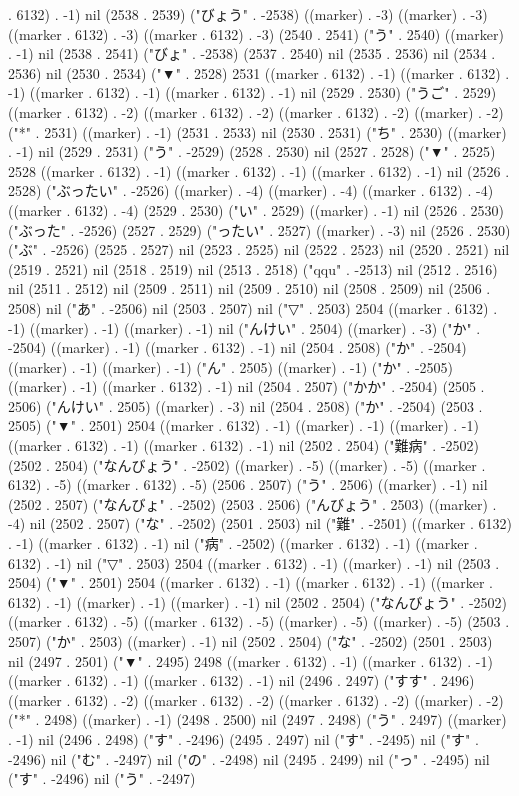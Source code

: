 . 6132) . -1) nil (2538 . 2539) ("びょう" . -2538) ((marker) . -3) ((marker) . -3) ((marker . 6132) . -3) ((marker . 6132) . -3) (2540 . 2541) ("う" . 2540) ((marker) . -1) nil (2538 . 2541) ("びょ" . -2538) (2537 . 2540) nil (2535 . 2536) nil (2534 . 2536) nil (2530 . 2534) ("▼" . 2528) 2531 ((marker . 6132) . -1) ((marker . 6132) . -1) ((marker . 6132) . -1) ((marker . 6132) . -1) nil (2529 . 2530) ("うご" . 2529) ((marker . 6132) . -2) ((marker . 6132) . -2) ((marker . 6132) . -2) ((marker) . -2) ("*" . 2531) ((marker) . -1) (2531 . 2533) nil (2530 . 2531) ("ち" . 2530) ((marker) . -1) nil (2529 . 2531) ("う" . -2529) (2528 . 2530) nil (2527 . 2528) ("▼" . 2525) 2528 ((marker . 6132) . -1) ((marker . 6132) . -1) ((marker . 6132) . -1) nil (2526 . 2528) ("ぶったい" . -2526) ((marker) . -4) ((marker) . -4) ((marker . 6132) . -4) ((marker . 6132) . -4) (2529 . 2530) ("い" . 2529) ((marker) . -1) nil (2526 . 2530) ("ぶった" . -2526) (2527 . 2529) ("ったい" . 2527) ((marker) . -3) nil (2526 . 2530) ("ぶ" . -2526) (2525 . 2527) nil (2523 . 2525) nil (2522 . 2523) nil (2520 . 2521) nil (2519 . 2521) nil (2518 . 2519) nil (2513 . 2518) ("qqu" . -2513) nil (2512 . 2516) nil (2511 . 2512) nil (2509 . 2511) nil (2509 . 2510) nil (2508 . 2509) nil (2506 . 2508) nil ("あ" . -2506) nil (2503 . 2507) nil ("▽" . 2503) 2504 ((marker . 6132) . -1) ((marker) . -1) ((marker) . -1) nil ("んけい" . 2504) ((marker) . -3) ("か" . -2504) ((marker) . -1) ((marker . 6132) . -1) nil (2504 . 2508) ("か" . -2504) ((marker) . -1) ((marker) . -1) ("ん" . 2505) ((marker) . -1) ("か" . -2505) ((marker) . -1) ((marker . 6132) . -1) nil (2504 . 2507) ("かか" . -2504) (2505 . 2506) ("んけい" . 2505) ((marker) . -3) nil (2504 . 2508) ("か" . -2504) (2503 . 2505) ("▼" . 2501) 2504 ((marker . 6132) . -1) ((marker) . -1) ((marker) . -1) ((marker . 6132) . -1) ((marker . 6132) . -1) nil (2502 . 2504) ("難病" . -2502) (2502 . 2504) ("なんびょう" . -2502) ((marker) . -5) ((marker) . -5) ((marker . 6132) . -5) ((marker . 6132) . -5) (2506 . 2507) ("う" . 2506) ((marker) . -1) nil (2502 . 2507) ("なんびょ" . -2502) (2503 . 2506) ("んびょう" . 2503) ((marker) . -4) nil (2502 . 2507) ("な" . -2502) (2501 . 2503) nil ("難" . -2501) ((marker . 6132) . -1) ((marker . 6132) . -1) nil ("病" . -2502) ((marker . 6132) . -1) ((marker . 6132) . -1) nil ("▽" . 2503) 2504 ((marker . 6132) . -1) ((marker) . -1) nil (2503 . 2504) ("▼" . 2501) 2504 ((marker . 6132) . -1) ((marker . 6132) . -1) ((marker . 6132) . -1) ((marker) . -1) ((marker) . -1) nil (2502 . 2504) ("なんびょう" . -2502) ((marker . 6132) . -5) ((marker . 6132) . -5) ((marker) . -5) ((marker) . -5) (2503 . 2507) ("か" . 2503) ((marker) . -1) nil (2502 . 2504) ("な" . -2502) (2501 . 2503) nil (2497 . 2501) ("▼" . 2495) 2498 ((marker . 6132) . -1) ((marker . 6132) . -1) ((marker . 6132) . -1) ((marker . 6132) . -1) nil (2496 . 2497) ("すす" . 2496) ((marker . 6132) . -2) ((marker . 6132) . -2) ((marker . 6132) . -2) ((marker) . -2) ("*" . 2498) ((marker) . -1) (2498 . 2500) nil (2497 . 2498) ("う" . 2497) ((marker) . -1) nil (2496 . 2498) ("す" . -2496) (2495 . 2497) nil ("す" . -2495) nil ("す" . -2496) nil ("む" . -2497) nil ("の" . -2498) nil (2495 . 2499) nil ("っ" . -2495) nil ("す" . -2496) nil ("う" . -2497) 